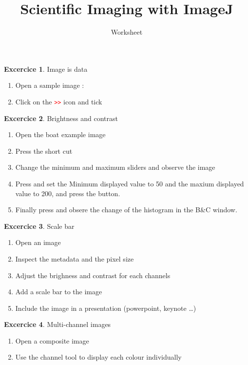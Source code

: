 \documentclass[xcolor=table]{scrartcl}
\title{Scientific Imaging with ImageJ}
\subtitle{Worksheet}
\theoremstyle{definition}
\newtheorem{exercice}{Excercice}
\begin{document}
\maketitle

\begin{exercice} Image is data
  \begin{enumerate}
  \item Open a sample image : 
  \item Click on the \textcolor{red}{\texttt{>>}} icon and tick
  \end{enumerate}
\end{exercice}

\begin{exercice} Brightness and contrast
  \begin{enumerate}
  \item Open the boat example image 
  \item Press the short cut 
  \item Change the minimum and maximum sliders and observe the image
  \item Press  and set the Minimum displayed value to 50
    and the maxium displayed value to 200, and press the  button.
  \item Finally press  and obsere the change of the
    histogram in the B\&C window.
  \end{enumerate}
\end{exercice}

\begin{exercice} Scale bar
  \begin{enumerate}
  \item Open an image %
  \item Inspect the metadata  and the pixel size 
  \item Adjust the brighness and contrast for each channels
  \item Add a scale bar to the image
  \item Include the image in a presentation (powerpoint, keynote \dots)
  \end{enumerate}
\end{exercice}


\begin{exercice} Multi-channel images
  \begin{enumerate}
  \item Open a composite image 
  \item Use the channel tool to display each colour individually
  \end{enumerate}
\end{exercice}
\end{document}
